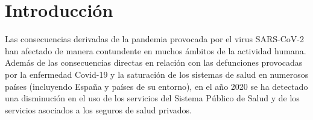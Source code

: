 \documentclass[12pt,twoside]{article} %
\begin{document}
\buecereportheaders

\setcounter{page}{1}

\section{Introducción}  %
Las consecuencias derivadas de la pandemia provocada por el virus SARS-CoV-2 han afectado de manera contundente en muchos ámbitos de la actividad humana. Además de las consecuencias directas en relación con las defunciones provocadas por la enfermedad Covid-19 y la saturación de los sistemas de salud en numerosos países (incluyendo España y países de su entorno), en el año 2020 se ha detectado una disminución en el uso de los servicios del Sistema Público de Salud y de los servicios asociados a los seguros de salud privados. 
\end{document}
